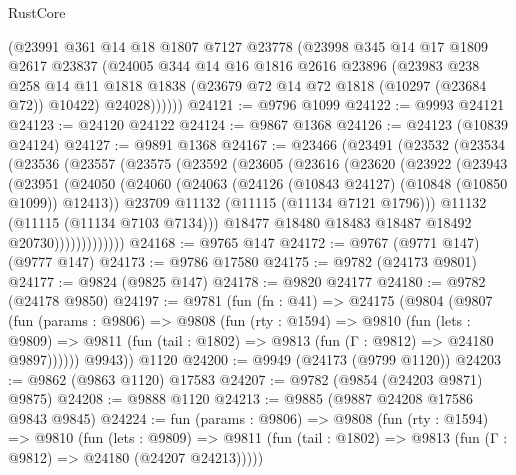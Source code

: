 \begin{lexlean}{RustCore}
\begin{coremodule}
        (@23991
          @361
          @14
          @18
          @1807
          @7127
          @23778
          (@23998
            @345
            @14
            @17
            @1809
            @2617
            @23837
            (@24005
              @344
              @14
              @16
              @1816
              @2616
              @23896
              (@23983
                @238
                @258
                @14
                @11
                @1818
                @1838
                (@23679 @72 @14 @72 @1818 (@10297 (@23684 @72)) @10422)
                @24028))))))
@24121 := @9796 @1099
@24122 := @9993 @24121
@24123 := @24120 @24122
@24124 := @9867 @1368
@24126 := @24123 (@10839 @24124)
@24127 := @9891 @1368
@24167 := @23466
    (@23491
      (@23532
        (@23534
          (@23536
            (@23557
              (@23575
                (@23592
                  (@23605
                    (@23616
                      (@23620
                        (@23922
                          (@23943
                            (@23951
                              (@24050
                                (@24060
                                  (@24063 (@24126 (@10843 @24127) (@10848 (@10850 @1099)) @12413))
                                  @23709
                                  @11132
                                  (@11115 (@11134 @7121 @1796)))
                                @11132
                                (@11115 (@11134 @7103 @7134)))
                              @18477
                              @18480
                              @18483
                              @18487
                              @18492
                              @20730)))))))))))))
@24168 := @9765 @147
@24172 := @9767 (@9771 @147) (@9777 @147)
@24173 := @9786 @17580
@24175 := @9782 (@24173 @9801)
@24177 := @9824 (@9825 @147)
@24178 := @9820 @24177
@24180 := @9782 (@24178 @9850)
@24197 := @9781
    (fun (fn : @41) =>
    @24175
      (@9804
        (@9807
          (fun (params : @9806) =>
          @9808
            (fun (rty : @1594) =>
            @9810
              (fun (lets : @9809) =>
              @9811 (fun (tail : @1802) => @9813 (fun (Γ : @9812) => @24180 @9897))))))
        @9943))
    @1120
@24200 := @9949 (@24173 (@9799 @1120))
@24203 := @9862 (@9863 @1120) @17583
@24207 := @9782 (@9854 (@24203 @9871) @9875)
@24208 := @9888 @1120
@24213 := @9885 (@9887 @24208 @17586 @9843 @9845)
@24224 := fun (params : @9806) =>
  @9808
    (fun (rty : @1594) =>
    @9810
      (fun (lets : @9809) =>
      @9811 (fun (tail : @1802) => @9813 (fun (Γ : @9812) => @24180 (@24207 @24213)))))

\end{coremodule}
\end{lexlean}
